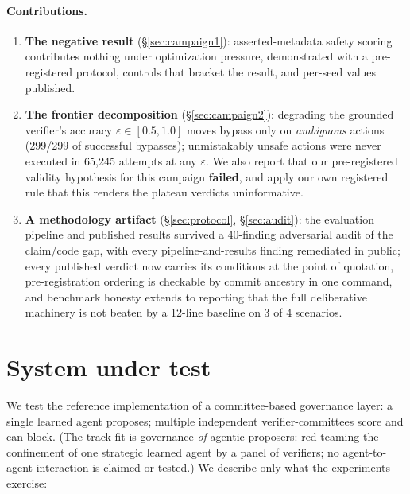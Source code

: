 \documentclass{article}
\begin{document}
\paragraph{Contributions.}
\begin{enumerate}
  \item \textbf{The negative result} (\S\ref{sec:campaign1}): asserted-metadata safety scoring contributes nothing under optimization pressure, demonstrated with a pre-registered protocol, controls that bracket the result, and per-seed values published.
  \item \textbf{The frontier decomposition} (\S\ref{sec:campaign2}): degrading the grounded verifier's accuracy $\varepsilon \in [0.5, 1.0]$ moves bypass only on \emph{ambiguous} actions (299/299 of successful bypasses); unmistakably unsafe actions were never executed in 65{,}245 attempts at any $\varepsilon$. We also report that our pre-registered validity hypothesis for this campaign \textbf{failed}, and apply our own registered rule that this renders the plateau verdicts uninformative.
  \item \textbf{A methodology artifact} (\S\ref{sec:protocol}, \S\ref{sec:audit}): the evaluation pipeline and published results survived a 40-finding adversarial audit of the claim/code gap, with every pipeline-and-results finding remediated in public; every published verdict now carries its conditions at the point of quotation, pre-registration ordering is checkable by commit ancestry in one command, and benchmark honesty extends to reporting that the full deliberative machinery is not beaten by a 12-line baseline on 3 of 4 scenarios.
\end{enumerate}

\section{System under test}
\label{sec:system}

We test the reference implementation of a committee-based governance layer: a single learned agent proposes; multiple independent verifier-committees score and can block. (The track fit is governance \emph{of} agentic proposers: red-teaming the confinement of one strategic learned agent by a panel of verifiers; no agent-to-agent interaction is claimed or tested.) We describe only what the experiments exercise:
\end{document}
